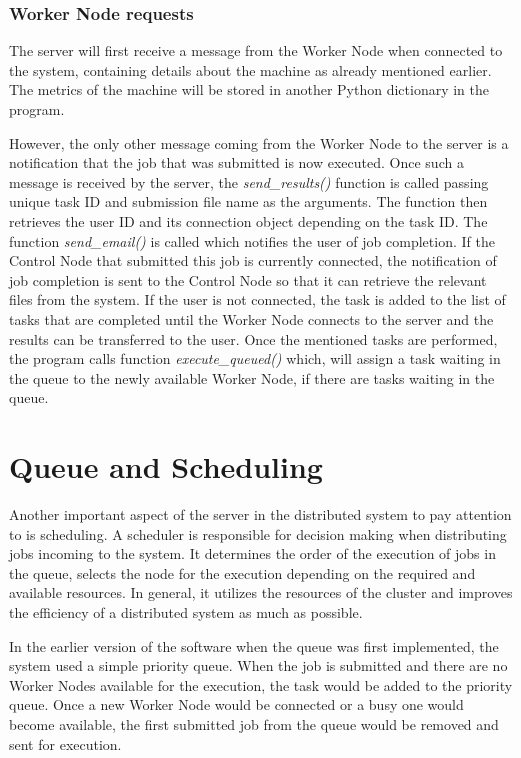 \documentclass[10pt]{report}
\begin{document}
\subsubsection{Worker Node requests}

The server will first receive a message from the Worker Node when connected to the system, containing details about the machine as already mentioned earlier. The metrics of the machine will be stored in another Python dictionary in the program.
\newline

However, the only other message coming from the Worker Node to the server is a notification that the job that was submitted is now executed. Once such a message is received by the server, the \textit{send\_results()} function is called passing unique task ID and submission file name as the arguments. The function then retrieves the user ID and its connection object depending on the task ID. The function \textit{send\_email()} is called which notifies the user of job completion. If the Control Node that submitted this job is currently connected, the notification of job completion is sent to the Control Node so that it can retrieve the relevant files from the system. If the user is not connected, the task is added to the list of tasks that are completed until the Worker Node connects to the server and the results can be transferred to the user. Once the mentioned tasks are performed, the program calls function \textit{execute\_queued()} which, will assign a task waiting in the queue to the newly available Worker Node, if there are tasks waiting in the queue.

\section{Queue and Scheduling} \label{queueschedule}

Another important aspect of the server in the distributed system to pay attention to is scheduling. A scheduler is responsible for decision making when distributing jobs incoming to the system. It determines the order of the execution of jobs in the queue, selects the node for the execution depending on the required and available resources. In general, it utilizes the resources of the cluster and improves the efficiency of a distributed system as much as possible.
\newline

In the earlier version of the software when the queue was first implemented, the system used a simple priority queue. When the job is submitted and there are no Worker Nodes available for the execution, the task would be added to the priority queue. Once a new Worker Node would be connected or a busy one would become available, the first submitted job from the queue would be removed and sent for execution.
\newline
\end{document}
